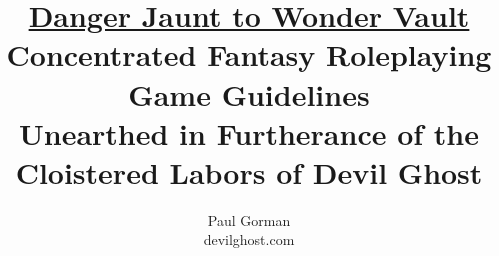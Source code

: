 \documentclass[fontsize=9pt,twoside]{scrreprt}
\begin{document}
\title{\normalfont\normalsize \uline{Danger Jaunt to Wonder Vault} \\ \vspace{3ex} \footnotesize Concentrated Fantasy Roleplaying Game Guidelines \\ Unearthed in Furtherance of the Cloistered Labors of Devil Ghost}
\author{\normalsize Paul Gorman \\ \footnotesize devilghost.com}
\date{}
\maketitle


\end{document}
